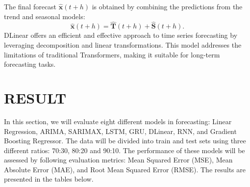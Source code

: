 \documentclass{ieeeojies}
\begin{document}
The final forecast \( \hat{\mathbf{x}}(t+h) \) is obtained by combining the predictions from the trend and seasonal models:
\begin{equation}
    \hat{\mathbf{x}}(t+h) = \hat{\mathbf{T}}(t+h) + \hat{\mathbf{S}}(t+h).
\end{equation}
DLinear offers an efficient and effective approach to time series forecasting by leveraging decomposition and linear transformations. This model addresses the limitations of traditional Transformers, making it suitable for long-term forecasting tasks.
\section{RESULT}
In this section, we will evaluate eight different models in forecasting: Linear Regression, ARIMA, SARIMAX, LSTM, GRU, DLinear, RNN, and Gradient Boosting Regressor. The data will be divided into train and test sets using three different ratios: 70:30, 80:20 and 90:10. The performance of these models will be assessed by following evaluation metrics: Mean Squared Error (MSE), Mean Absolute Error (MAE), and Root Mean Squared Error (RMSE). The results are presented in the tables below.
\end{document}
